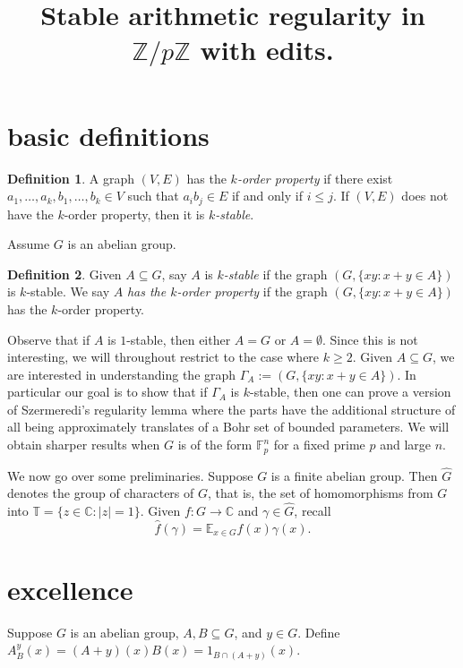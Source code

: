 \documentclass[11pt]{article}
\title{
Stable arithmetic regularity in $\mathbb{Z}/p\mathbb{Z}$ with edits.
}
\author{
}
\date{}
\theoremstyle{definition}
\newtheorem{definition}{Definition}
\begin{document}
\maketitle


\section{basic definitions}


\begin{definition}
A graph $(V,E)$ has the \emph{$k$-order property} if there exist $a_1,\ldots, a_k,b_1,\ldots, b_k\in V$ such that $a_ib_j\in E$ if and only if $i\leq j$. If $(V,E)$ does not have the $k$-order property, then it is \emph{$k$-stable}.
\end{definition}

Assume $G$ is an abelian group.  
\begin{definition}
Given $A\subseteq G$, say $A$ is \emph{$k$-stable} if the graph $(G,\{xy: x+y\in A\})$ is $k$-stable.  We say $A$ \emph{has the $k$-order property} if the graph $(G,\{xy: x+y\in A\})$ has the $k$-order property.
\end{definition}

Observe that if $A$ is $1$-stable, then either $A=G$ or $A=\emptyset$.  Since this is not interesting, we will throughout restrict to the case where $k\geq 2$. Given $A\subseteq G$, we are interested in understanding the graph $\Gamma_A:=(G,\{xy: x+y\in A\})$.  In particular our goal is to show that if $\Gamma_A$ is $k$-stable, then one can prove a version of Szermeredi's regularity lemma where the parts have the additional structure of all being approximately translates of a Bohr set of bounded parameters.  We will obtain sharper results when $G$ is of the form $\mathbb{F}_p^n$ for a fixed prime $p$ and large $n$.  

We now go over some preliminaries. Suppose $G$ is a finite abelian group.  Then $\widehat{G}$ denotes the group of characters of $G$, that is, the set of homomorphisms from $G$ into $\mathbb{T}=\{z\in \mathbb{C}: |z|=1\}$.  Given $f:G\rightarrow \mathbb{C}$ and $\gamma\in \widehat{G}$, recall 
$$
\widehat{f}(\gamma)=\mathbb{E}_{x\in G} f(x)\gamma(x).
$$



\section{excellence}
Suppose $G$ is an abelian group, $A, B\subseteq G$, and $y\in G$.  Define $A^{y}_B(x)=(A+y)(x)B(x)=1_{B\cap (A+y)}(x)$. 
\end{document}
